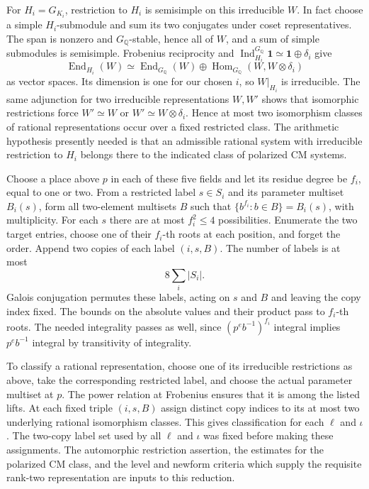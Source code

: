 For \(H_i=G_{K_i}\), restriction to \(H_i\) is semisimple on
this irreducible \(W\). In fact choose a simple \(H_i\)-submodule
and sum its two conjugates under coset representatives. The span
is nonzero and \(G_{\mathbb Q}\)-stable, hence all of \(W\), and
a sum of simple submodules is semisimple. Frobenius reciprocity
and \(\operatorname{Ind}_{H_i}^{G_{\mathbb Q}}\mathbf1
\simeq\mathbf1\oplus\delta_i\) give
\[
 \operatorname{End}_{H_i}(W)
    \simeq\operatorname{End}_{G_{\mathbb Q}}(W)
       \oplus\operatorname{Hom}_{G_{\mathbb Q}}
                             (W,W\otimes\delta_i)
\]
as vector spaces. Its dimension is one for our chosen \(i\), so
\(W|_{H_i}\) is irreducible. The same adjunction for two irreducible
representations \(W,W'\) shows that isomorphic restrictions force
\(W'\simeq W\) or \(W'\simeq W\otimes\delta_i\). Hence at most two
isomorphism classes of rational representations occur over a fixed
restricted class. The arithmetic hypothesis presently needed is
that an admissible rational system with irreducible restriction to
\(H_i\) belongs there to the indicated class of polarized CM systems.

Choose a place above \(p\) in each of these five fields and let its
residue degree be \(f_i\), equal to one or two. From a restricted
label \(s\in S_i\) and its parameter multiset \(B_i(s)\), form all
two-element multisets \(B\) such that
\(\{b^{f_i}:b\in B\}=B_i(s)\), with multiplicity. For each \(s\)
there are at most \(f_i^2\le4\) possibilities. Enumerate the two
target entries, choose one of their \(f_i\)-th roots at each
position, and forget the order. Append two copies of each label
\((i,s,B)\). The number of labels is at most
\[
                       8\sum_i |S_i|.
\]
Galois conjugation permutes these labels, acting on \(s\) and \(B\)
and leaving the copy index fixed. The bounds on the absolute values
and their product pass to \(f_i\)-th roots. The needed integrality
passes as well, since \((p^e b^{-1})^{f_i}\) integral implies
\(p^eb^{-1}\) integral by transitivity of integrality.

To classify a rational representation, choose one of its irreducible
restrictions as above, take the corresponding restricted label, and
choose the actual parameter multiset at \(p\). The power relation at
Frobenius ensures that it is among the listed lifts. At each fixed
triple \((i,s,B)\) assign distinct copy indices to its at most two
underlying rational isomorphism classes. This gives classification
for each \(\ell\) and \(\iota\). The two-copy label set used by all
\(\ell\) and \(\iota\) was fixed before making these assignments.
The automorphic restriction assertion, the estimates for the
polarized CM class, and the level and newform criteria which supply
the requisite rank-two representation are inputs to this reduction.

